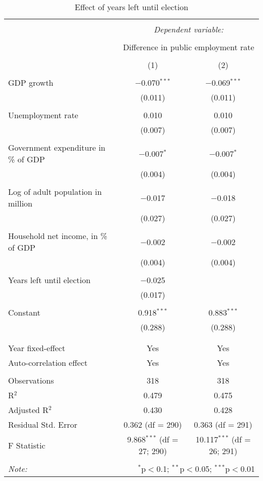 
\begin{table}[!htbp] \centering 
  \caption{Effect of years left until election} 
  \label{} 
\begin{tabular}{@{\extracolsep{5pt}}lcc} 
\\[-1.8ex]\hline 
\hline \\[-1.8ex] 
 & \multicolumn{2}{c}{\textit{Dependent variable:}} \\ 
\cline{2-3} 
\\[-1.8ex] & \multicolumn{2}{c}{Difference in public employment rate} \\ 
\\[-1.8ex] & (1) & (2)\\ 
\hline \\[-1.8ex] 
 GDP growth & $-$0.070$^{***}$ & $-$0.069$^{***}$ \\ 
  & (0.011) & (0.011) \\ 
  & & \\ 
 Unemployment rate & 0.010 & 0.010 \\ 
  & (0.007) & (0.007) \\ 
  & & \\ 
 Government expenditure in \% of GDP & $-$0.007$^{*}$ & $-$0.007$^{*}$ \\ 
  & (0.004) & (0.004) \\ 
  & & \\ 
 Log of adult population in million & $-$0.017 & $-$0.018 \\ 
  & (0.027) & (0.027) \\ 
  & & \\ 
 Household net income, in \% of GDP & $-$0.002 & $-$0.002 \\ 
  & (0.004) & (0.004) \\ 
  & & \\ 
 Years left until election & $-$0.025 &  \\ 
  & (0.017) &  \\ 
  & & \\ 
 Constant & 0.918$^{***}$ & 0.883$^{***}$ \\ 
  & (0.288) & (0.288) \\ 
  & & \\ 
\hline \\[-1.8ex] 
Year fixed-effect & Yes & Yes \\ 
Auto-correlation effect & Yes & Yes \\ 
\hline \\[-1.8ex] 
Observations & 318 & 318 \\ 
R$^{2}$ & 0.479 & 0.475 \\ 
Adjusted R$^{2}$ & 0.430 & 0.428 \\ 
Residual Std. Error & 0.362 (df = 290) & 0.363 (df = 291) \\ 
F Statistic & 9.868$^{***}$ (df = 27; 290) & 10.117$^{***}$ (df = 26; 291) \\ 
\hline 
\hline \\[-1.8ex] 
\textit{Note:}  & \multicolumn{2}{r}{$^{*}$p$<$0.1; $^{**}$p$<$0.05; $^{***}$p$<$0.01} \\ 
\end{tabular} 
\end{table} 

